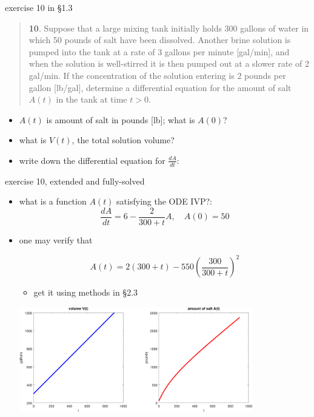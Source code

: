\documentclass{beamer}
\begin{document}
\begin{frame}{exercise 10 in \S 1.3}

\scriptsize
\begin{quotation}
\noindent \textbf{10}.  Suppose that a large mixing tank initially holds 300 gallons of water in which 50 pounds of salt have been dissolved.  Another brine solution is pumped into the tank at a rate of 3 gallons per minute [gal/min], and when the solution is well-stirred it is then pumped out at a slower rate of 2 gal/min.  If the concentration of the solution entering is 2 pounds per gallon [lb/gal], determine a differential equation for the amount of salt $A(t)$ in the tank at time $t>0$.
\end{quotation}

\small
\begin{itemize}
\item $A(t)$ is amount of salt in pounds [lb]; what is $A(0)$?
\item what is $V(t)$, the total solution volume?
\item write down the differential equation for $\frac{dA}{dt}$:

\vspace{30mm}
\end{itemize}
\end{frame}


\begin{frame}{exercise 10, extended and fully-solved}

\begin{itemize}
\item what is a function $A(t)$ satisfying the ODE IVP?:
    $$\frac{dA}{dt} = 6 - \frac{2}{300+t} A, \quad A(0)=50$$
\item one may verify that

\vspace{-5mm}
    $$A(t) = 2 (300+t) - 550 \left(\frac{300}{300+t}\right)^2$$

\vspace{-2mm}
    \begin{itemize}
    \item get it using methods in \S 2.3
    \end{itemize}

\centerline{\includegraphics[width=0.8\textwidth]{exercise-10-1-3}}
\end{itemize}
\end{frame}
\end{document}
